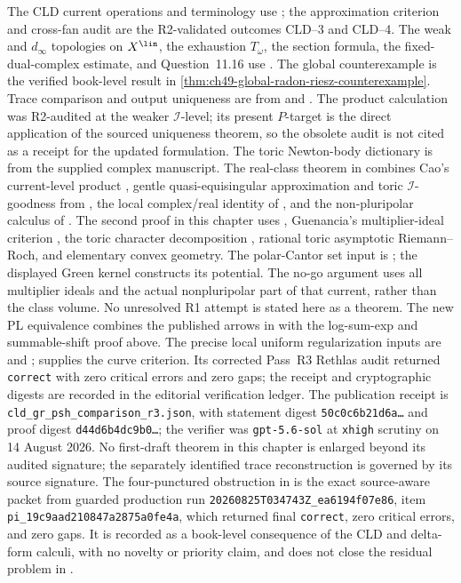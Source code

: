 The CLD current operations and terminology use \cite{CLD25}; the
approximation criterion and cross-fan audit are the R2-validated
outcomes CLD--3 and CLD--4. The weak and $d_\infty$ topologies on
$X^{\lin}$, the exhaustion $T_\omega$, the section formula, the
fixed-dual-complex estimate, and Question~11.16 use \cite{BJ22}.  The
global counterexample is the verified book-level result in
\cref{thm:ch49-global-radon-riesz-counterexample}. Trace comparison and
output uniqueness are from
\cite{DX24} and .  The product calculation was
R2-audited at the weaker $\mathcal I$-level; its present $P$-target is the
direct application of the sourced uniqueness theorem, so the obsolete audit
is not cited as a receipt for the updated formulation.  The toric
Newton-body dictionary is from the supplied complex manuscript.  The
real-class theorem in  combines Cao's
current-level product \cite[Definitions~2--3]{Cao14}, gentle
quasi-equisingular approximation and toric $\mathcal I$-goodness from
\cite{XiaBook}, the local complex/real identity of \cite{CGSZ19}, and the
non-pluripolar calculus of \cite{BEGZ10}.  The second proof in this chapter
uses \cite[Proposition~4.4]{Cao14}, Guenancia's multiplier-ideal criterion
\cite[Theorem~1.13]{Guenancia12}, the toric character decomposition
\cite[\S4.3]{CLS11}, rational toric asymptotic Riemann--Roch, and elementary
convex geometry.
The polar-Cantor set input is \cite[p.~31]{Car83}; the displayed Green
kernel constructs its potential. The no-go argument uses all multiplier
ideals and the actual nonpluripolar part of that current, rather than the
class volume. No unresolved R1 attempt is
stated here as a theorem.  The new PL equivalence combines the published
arrows in \cite{GR25PL,GR25Classical,GJR26} with the log-sum-exp and
summable-shift proof above. The precise local uniform regularization
inputs are \cite[Theorem~1.5]{GR25PL} and
\cite[Proposition~7.10]{GJR26}; \cite[Theorem~5.3]{GR25PL} supplies
the curve criterion. Its corrected Pass~R3 Rethlas audit returned
\texttt{correct} with zero critical errors and zero gaps; the receipt and
cryptographic digests are recorded in the editorial verification ledger.
The publication receipt is
\texttt{cld\_gr\_psh\_comparison\_r3.json}, with statement digest
\texttt{50c0c6b21d6a\ldots} and proof digest
\texttt{d44d6b4dc9b0\ldots}; the verifier was
\texttt{gpt-5.6-sol} at \texttt{xhigh} scrutiny on 14 August 2026. No
first-draft theorem in this chapter is enlarged beyond its audited
signature; the separately identified trace reconstruction is governed by
its source signature.  The four-punctured obstruction in
 is the exact
source-aware packet from guarded production run
\nolinkurl{20260825T034743Z_ea6194f07e86}, item
\nolinkurl{pi_19c9aad210847a2875a0fe4a}, which returned final
\texttt{correct}, zero critical errors, and zero gaps.  It is recorded as a
book-level consequence of the CLD and delta-form calculi, with no novelty or
priority claim, and does not close the residual problem in
.
